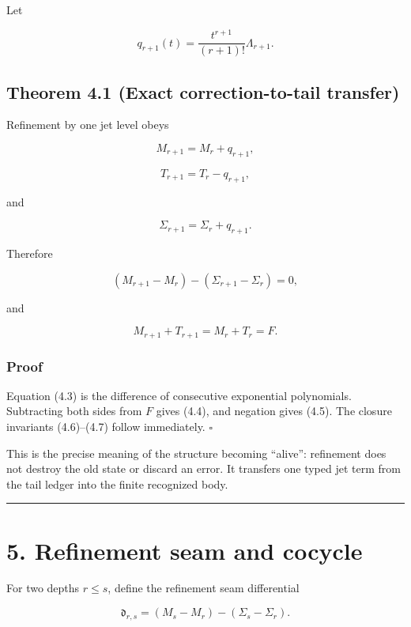 Let

\[
q_{r+1}(t)=\frac{t^{r+1}}{(r+1)!}\Lambda_{r+1}.
\tag{4.2}
\]

\hypertarget{theorem-4.1-exact-correction-to-tail-transfer}{%
\subsection{Theorem 4.1 (Exact correction-to-tail transfer)}\label{theorem-4.1-exact-correction-to-tail-transfer}}

Refinement by one jet level obeys

\[
\boxed{M_{r+1}=M_r+q_{r+1},}
\tag{4.3}
\]

\[
\boxed{T_{r+1}=T_r-q_{r+1},}
\tag{4.4}
\]

and

\[
\boxed{\Sigma_{r+1}=\Sigma_r+q_{r+1}.}
\tag{4.5}
\]

Therefore

\[
\boxed{
(M_{r+1}-M_r)-(\Sigma_{r+1}-\Sigma_r)=0,
}
\tag{4.6}
\]

and

\[
\boxed{M_{r+1}+T_{r+1}=M_r+T_r=F.}
\tag{4.7}
\]

\hypertarget{proof-1}{%
\subsubsection{Proof}\label{proof-1}}

Equation (4.3) is the difference of consecutive exponential polynomials.
Subtracting both sides from \(F\) gives (4.4), and negation gives (4.5). The
closure invariants (4.6)--(4.7) follow immediately. \(\square\)

This is the precise meaning of the structure becoming ``alive'': refinement does
not destroy the old state or discard an error. It transfers one typed jet term
from the tail ledger into the finite recognized body.

\begin{center}\rule{0.5\linewidth}{0.5pt}\end{center}

\hypertarget{refinement-seam-and-cocycle}{%
\section{5. Refinement seam and cocycle}\label{refinement-seam-and-cocycle}}

For two depths \(r\le s\), define the refinement seam differential

\[
\boxed{
\mathfrak d_{r,s}
=(M_s-M_r)-(\Sigma_s-\Sigma_r).
}
\tag{5.1}
\]

